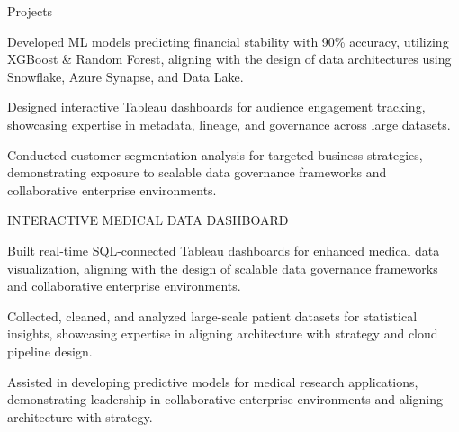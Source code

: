 \documentclass{resume} %
\begin{document}
\begin{rSection}{Projects}
\begin{rSubsection}
                                {}{}{}
                                    \item Developed ML models predicting financial stability with 90\% accuracy, utilizing XGBoost \& Random Forest, aligning with the design of data architectures using Snowflake, Azure Synapse, and Data Lake.
                                    \item Designed interactive Tableau dashboards for audience engagement tracking, showcasing expertise in metadata, lineage, and governance across large datasets.
                                    \item Conducted customer segmentation analysis for targeted business strategies, demonstrating exposure to scalable data governance frameworks and collaborative enterprise environments.
                            \end{rSubsection}
                    \begin{rSubsection}
                                    {INTERACTIVE MEDICAL DATA DASHBOARD}
                                {}{}{}
                                    \item Built real{-}time SQL{-}connected Tableau dashboards for enhanced medical data visualization, aligning with the design of scalable data governance frameworks and collaborative enterprise environments.
                                    \item Collected, cleaned, and analyzed large{-}scale patient datasets for statistical insights, showcasing expertise in aligning architecture with strategy and cloud pipeline design.
                                    \item Assisted in developing predictive models for medical research applications, demonstrating leadership in collaborative enterprise environments and aligning architecture with strategy.
                            \end{rSubsection}
            \end{rSection}
\end{document}
